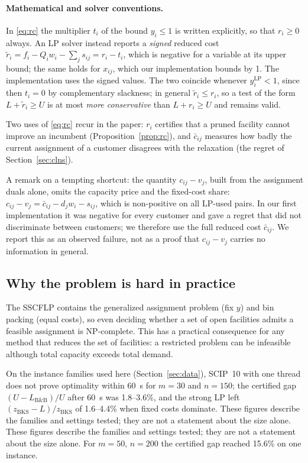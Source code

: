\paragraph{Mathematical and solver conventions.} In \eqref{eq:rc} the multiplier $t_i$ of the
bound $y_i\le1$ is written explicitly, so that $r_i\ge0$ always. An LP solver instead reports a
\emph{signed} reduced cost $\tilde r_i=f_i-Q_iw_i-\sum_j s_{ij}=r_i-t_i$, which is negative for
a variable at its upper bound; the same holds for $x_{ij}$, which our implementation bounds by 1.
The implementation uses the signed values. The two coincide whenever $y_i^{\mathrm{LP}}<1$, since then $t_i=0$ by complementary
slackness; in general $\tilde r_i\le r_i$, so a test of the form $L+\tilde r_i\ge U$ is at most
\emph{more conservative} than $L+r_i\ge U$ and remains valid.

Two uses of \eqref{eq:rc} recur in the paper: $r_i$ certifies that a pruned facility cannot
improve an incumbent (Proposition~\ref{prop:rc}), and $\bar c_{ij}$ measures how badly the
current assignment of a customer disagrees with the relaxation (the regret of
Section~\ref{sec:clns}).

A remark on a tempting shortcut: the quantity $c_{ij}-v_j$, built from the assignment duals
alone, omits the capacity price and the fixed-cost share: $c_{ij}-v_j=\bar c_{ij}-d_jw_i-s_{ij}$,
which is non-positive on all LP-used pairs. In our first implementation it was negative for
every customer and gave a regret that did not discriminate between customers; we therefore use
the full reduced cost $\bar c_{ij}$. We report this as an observed failure, not as a proof that
$c_{ij}-v_j$ carries no information in general.

\subsection{Why the problem is hard in practice}
The SSCFLP contains the generalized assignment problem (fix $y$) and bin packing (equal costs), so
even deciding whether a set of open facilities admits a feasible assignment is NP-complete. This
has a practical consequence for any method that reduces the set of facilities: a restricted
problem can be infeasible although total capacity exceeds total demand.

On the instance families used here (Section~\ref{sec:data}), SCIP~10 with one thread does not
prove optimality within 60~s for $m=30$ and $n=150$; the certified gap $(U-L_{\mathrm{B\&B}})/U$
after 60~s was 1.8--3.6\%, and the strong LP left $(z_{\mathrm{BKS}}-L)/z_{\mathrm{BKS}}$ of
1.6--4.4\% when fixed costs dominate. These figures describe the families and settings tested;
they are not a statement about the size alone. These figures describe the families and settings tested;
they are not a statement about the size alone. For $m=50$, $n=200$ the certified gap reached 15.6\% on one
instance.

